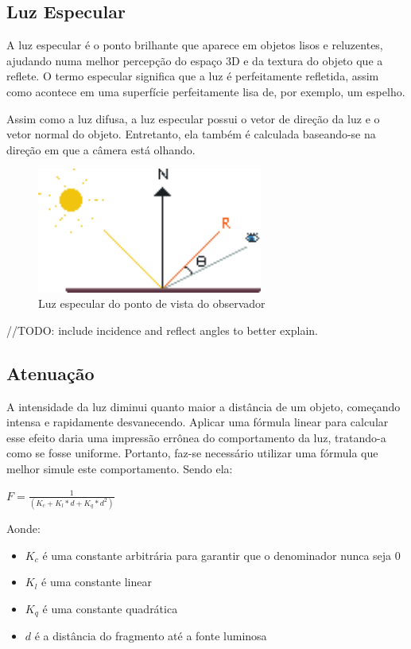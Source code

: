\documentclass[12pt, 
openright, 
oneside, 
a4paper,    
brazil]{facom-ufu-abntex2}
\begin{document}
\subsection{Luz Especular}
A luz especular é o ponto brilhante que aparece em objetos lisos e reluzentes, ajudando numa melhor percepção do espaço 3D e da textura do objeto que a reflete. O termo especular significa que a luz é perfeitamente refletida, assim como acontece em uma superfície perfeitamente lisa de, por exemplo, um espelho.

Assim como a luz difusa, a luz especular possui o vetor de direção da luz e o vetor normal do objeto. Entretanto, ela também é calculada baseando-se na direção em que a câmera está olhando.


\begin{figure}[H]
	\centering
	\includegraphics[width=20em]{imagens/specular.png}
	\caption{Luz especular do ponto de vista do observador}
\end{figure}

//TODO: include incidence and reflect angles to better explain.

\subsection{Atenuação}
A intensidade da luz diminui quanto maior a distância de um objeto, começando intensa e rapidamente desvanecendo. Aplicar uma fórmula linear para calcular esse efeito daria uma impressão errônea do comportamento da luz, tratando-a como se fosse uniforme. Portanto, faz-se necessário utilizar uma fórmula que melhor simule este comportamento. Sendo ela:

\begin{center}
$F = \frac{1} {(K_c + K_l*d + K_q*d^2)}$
\end{center}

Aonde:
\begin{itemize}
    \item $K_c$ é uma constante arbitrária para garantir que o denominador nunca seja 0
     \item $K_l$ é uma constante linear
     \item $K_q$ é uma constante quadrática
     \item $d$ é a distância do fragmento até a fonte luminosa
\end{itemize}
\end{document}
